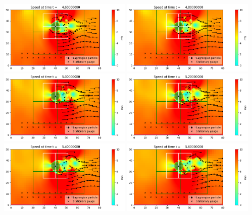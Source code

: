 \documentclass[11pt]{article}
\begin{document}
\vskip 10pt 
\includegraphics[width=0.475\textwidth]{frame0023fig0.png}
\vskip 10pt 
\includegraphics[width=0.475\textwidth]{frame0024fig0.png}
\vskip 10pt 
\includegraphics[width=0.475\textwidth]{frame0025fig0.png}
\vskip 10pt 
\includegraphics[width=0.475\textwidth]{frame0026fig0.png}
\vskip 10pt 
\includegraphics[width=0.475\textwidth]{frame0027fig0.png}
\vskip 10pt 
\includegraphics[width=0.475\textwidth]{frame0028fig0.png}
\end{document}
